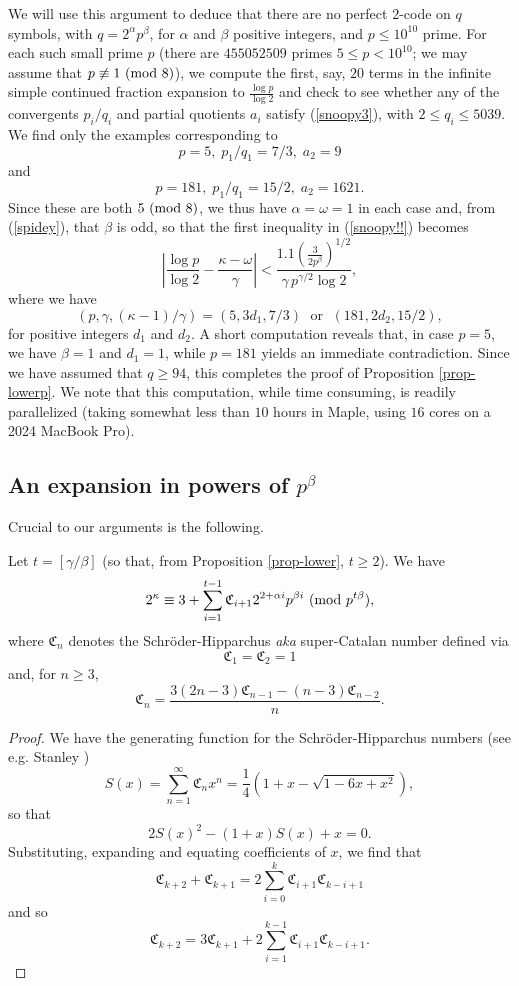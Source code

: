 \documentclass{amsart}
\def\mod#1{{\ifmmode\text{\rm\ (mod~$#1$)}
\else\discretionary{}{}{\hbox{ }}\rm(mod~$#1$)\fi}}
\begin{document}
{We will use this argument to deduce that there are no  perfect $2$-code on $q$ symbols, with $q=2^\alpha p^\beta$, for $\alpha$ and $\beta$  positive integers, and $p \leq 10^{10}$ prime. For each such small prime $p$ (there are $455052509$ primes $5 \leq p < 10^{10}$; we may assume that $p \not\equiv 1 \mod{8}$),
we compute the first, say, $20$ terms in the infinite simple continued fraction expansion to $\frac{\log p}{\log 2}$ and check to see whether any of the convergents $p_i/q_i$ and partial quotients $a_i$ satisfy (\ref{snoopy3}), with $2 \leq q_i \leq 5039$.
We find only the examples corresponding to
$$
p=5, \; p_1/q_1=7/3, \; a_2=9
$$
and 
$$
p=181, \; p_1/q_1=15/2, \; a_2=1621.
$$
Since these are both $5 \mod{8}$, we thus have $\alpha=\omega=1$ in each case and, from (\ref{spidey}), that $\beta$ is odd, so that the first inequality in 
(\ref{snoopy!!}) becomes
$$
\left|  \frac{\log p}{\log 2}- \frac{\kappa-\omega}{\gamma} \right| < \frac{1.1 \left( \frac{3}{2 p^\beta} \right)^{1/2} }{\gamma \, p^{\gamma/2} \log 2},
$$
where we have
$$
(p,\gamma, (\kappa-1)/\gamma) = (5,3d_1,7/3) \; \mbox{ or } \; (181,2d_2,15/2), 
$$
for positive integers $d_1$ and $d_2$. A short computation reveals that, in case $p=5$, we have $\beta =1$ and $d_1=1$, while $p=181$ yields an immediate contradiction. Since we have assumed that $q \geq 94$, this completes the proof of Proposition \ref{prop-lowerp}. We note that this computation, while time consuming, is readily parallelized (taking somewhat less than $10$ hours in Maple, using $16$ cores on a 2024 MacBook Pro).

 \subsection{An expansion in powers of $p^\beta$}
  
Crucial to our arguments is the following.
\begin{prop} \label{ghost}
Let $t = \left[ \gamma/\beta \right]$ (so that, from Proposition \ref{prop-lower}, $t \geq 2$).
We have
$$
2^\kappa \equiv  3 + \sum_{i=1}^{t-1} \mathfrak{C}_{i+1} 2^{2+\alpha i} p^{\beta i} \mod{p^{t \beta}},
$$
where $\mathfrak{C}_n$ denotes the Schr\"oder-Hipparchus {\it aka} super-Catalan number defined via
$$
\mathfrak{C}_1=\mathfrak{C}_2=1
$$
and, for $n \geq 3$,
$$
\mathfrak{C}_n = \frac{3(2n-3) \mathfrak{C}_{n-1} -(n-3) \mathfrak{C}_{n-2}}{n}.
$$
\end{prop}

\begin{proof}
 We have the generating function for the Schr\"oder-Hipparchus numbers (see e.g. Stanley \cite{S}) 
$$
S(x)=\sum_{n=1}^\infty  \mathfrak{C}_n x^n = 
\frac{1}{4} \left( 1+x -\sqrt{1-6x+x^2} \right),
$$
so that
$$
2 S(x)^2-(1+x) S(x) +x=0.
$$
Substituting, expanding and equating coefficients of $x$, we find that 
$$
 \mathfrak{C}_{k+2} +\mathfrak{C}_{k+1} = 
2  \sum_{i=0}^{k}   \mathfrak{C}_{i+1} \mathfrak{C}_{k-i+1}
$$
and so
\begin{equation} \label{pump}
 \mathfrak{C}_{k+2} =3 \mathfrak{C}_{k+1} 
+2  \sum_{i=1}^{k-1}   \mathfrak{C}_{i+1} \mathfrak{C}_{k-i+1}.
\end{equation}


\end{proof}}
\end{document}
